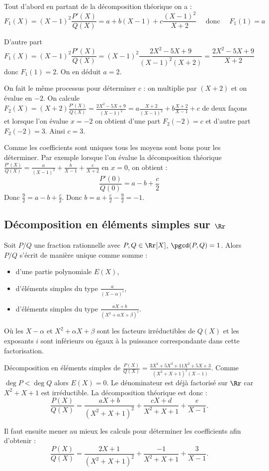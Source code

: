 \documentclass[class=report,crop=false]{standalone}
\begin{document}
\begin{exemple}
\begin{itemize}
Tout d'abord en partant de la décomposition théorique on a :
$$F_1(X)= (X-1)^2 \frac{P'(X)}{Q(X)} = a + b(X-1) + c\frac{(X-1)^2}{X+2} \quad
\text{ donc } \quad F_1(1)=a$$

D'autre part
$$F_1(X)=(X-1)^2 \frac{P'(X)}{Q(X)}= (X-1)^2\frac{2X^2-5X+9}{(X-1)^2 (X+2)}
= \frac{2X^2-5X+9}{X+2}$$
donc $F_1(1)=2.$
On en déduit $a=2$.

On fait le même processus pour déterminer $c$ : on
multiplie par $(X+2)$ et on évalue en $-2$. On calcule
$F_2(X) = (X+2)\frac{P'(X)}{Q(X)} = \frac{2X^2-5X+9}{(X-1)^2} = a\frac{X+2}{(X-1)^2} + b\frac{X+2}{X-1} + c$
de deux façons et lorsque l'on évalue $x=-2$ on obtient d'une part $F_2(-2) = c$ et
d'autre part $F_2(-2) = 3$. Ainsi $c=3$.

Comme les coefficients sont uniques tous les moyens sont bons pour les déterminer.
Par exemple lorsque l'on évalue la décomposition théorique
$\frac{P'(X)}{Q(X)}= \frac{a}{(X-1)^2} + \frac{b}{X-1} + \frac{c}{X+2}$
en $x=0$, on obtient :
$$\frac{P'(0)}{Q(0)} = a - b + \frac c2$$
Donc $\frac{9}{2} = a - b + \frac c2$. Donc $b=a + \frac c2 - \frac{9}{2}=-1$.
\end{itemize}
\end{exemple}

\subsection{Décomposition en éléments simples sur $\Rr$}

\begin{theoreme}
Soit $P/Q$ une fraction rationnelle avec $P,Q \in \Rr[X]$, $\pgcd(P,Q)=1$.
Alors $P/Q$ s'écrit de manière unique comme somme :
\begin{itemize}
  \item d'une partie polynomiale $E(X)$,
  \item d'éléments simples du type $\frac{a}{(X-\alpha)^i}$,
  \item d'éléments simples du type $\frac{aX+b}{(X^2+\alpha X + \beta)^i}$.
\end{itemize}
Où les $X-\alpha$ et $X^2+\alpha X + \beta$ sont les facteurs irréductibles de $Q(X)$
et les exposants $i$ sont inférieurs ou égaux à la puissance correspondante dans cette factorisation.
\end{theoreme}

\begin{exemple}
Décomposition en éléments simples de
$\frac{P(X)}{Q(X)}=\frac{3X^4+5X^3+11X^2+5X+3}{(X^2+X+1)^2(X-1)}$.
Comme $\deg P < \deg Q$ alors $E(X)=0$.
Le dénominateur est déjà factorisé sur $\Rr$ car $X^2+X+1$ est irréductible.
La décomposition théorique est donc :
$$\frac{P(X)}{Q(X)} = \frac{aX+b}{(X^2+X+1)^2}+\frac{cX+d}{X^2+X+1}+\frac{e}{X-1}.$$

Il faut ensuite mener au mieux les calculs pour déterminer les coefficients afin d'obtenir :
$$\frac{P(X)}{Q(X)} = \frac{2X+1}{(X^2+X+1)^2}+\frac{-1}{X^2+X+1}+\frac{3}{X-1}.$$
\end{exemple}
\end{document}
